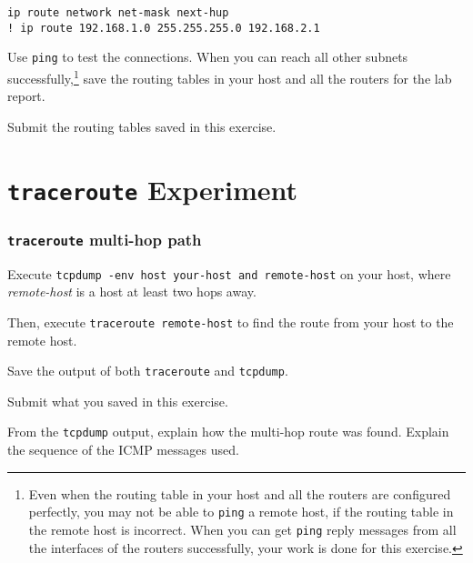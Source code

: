 \documentclass{../UTNetLab}
\begin{document}
    \begin{lstlisting}[language={cisco}, emph={network, net-mask, next-hup}]
ip route network net-mask next-hup
! ip route 192.168.1.0 255.255.255.0 192.168.2.1
    \end{lstlisting}

    Use \lstinline{ping} to test the connections.
    When you can reach all other subnets successfully,\footnote{Even when the routing table in your host and all the routers are configured perfectly, you may not be able to \lstinline{ping} a remote host, if the routing table in the remote host is incorrect.
    When you can get \lstinline{ping} reply messages from all the interfaces of the routers successfully, your work is done for this exercise.} save the routing tables in your host and all the routers for the lab report.
    
    \begin{report}
    \item Submit the routing tables saved in this exercise.
    \end{report}


\part{\texttt{traceroute} Experiment}\label{sec:traceroute}
\section{\texttt{traceroute} multi-hop path}
    Execute \lstinline[emph={your-host, remote-host}]{tcpdump -env host your-host and remote-host} on your host, where \textit{remote-host} is a host at least two hops away.

    Then, execute \lstinline[emph={your-host, remote-host}]{traceroute remote-host} to find the route from your host to the remote host.

    Save the output of both \lstinline{traceroute} and \lstinline{tcpdump}.

    \begin{report}
    \item Submit what you saved in this exercise.

    \item From the \lstinline{tcpdump} output, explain how the multi-hop route was found.
    Explain the sequence of the ICMP messages used.
    \end{report}
\end{document}
